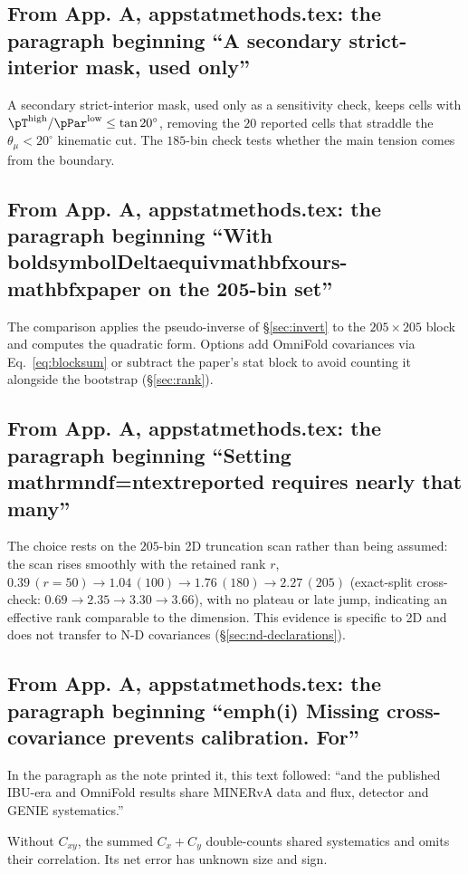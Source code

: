 \subsection{From App. A, appstatmethods.tex: the paragraph beginning ``A secondary strict-interior mask, used only''}
A secondary strict-interior mask, used only as a sensitivity check, keeps cells with $\pT^{\text{high}} / \pPar^{\text{low}} \le \tan 20^{\circ}$, removing the $20$ reported cells that straddle the $\theta_{\mu}<20^{\circ}$ kinematic cut. The $185$-bin check tests whether the main tension comes from the boundary.

\subsection{From App. A, appstatmethods.tex: the paragraph beginning ``With boldsymbolDeltaequivmathbfxours-mathbfxpaper on the 205-bin set''}
The comparison applies the pseudo-inverse of \S\ref{sec:invert} to the $205\times205$ block and computes the quadratic form. Options add OmniFold covariances via Eq.~\eqref{eq:blocksum} or subtract the paper's stat block to avoid counting it alongside the bootstrap (\S\ref{sec:rank}).

\subsection{From App. A, appstatmethods.tex: the paragraph beginning ``Setting mathrmndf=ntextreported requires nearly that many''}
The choice rests on the $205$-bin 2D truncation scan rather than being assumed: the scan rises smoothly with the retained rank $r$, $0.39\,(r{=}50)\to1.04\,(100)\to1.76\,(180)\to2.27\,(205)$ (exact-split cross-check: $0.69\to2.35\to3.30\to3.66$), with no plateau or late jump, indicating an effective rank comparable to the dimension. This evidence is specific to 2D and does not transfer to N-D covariances (\S\ref{sec:nd-declarations}).

\subsection{From App. A, appstatmethods.tex: the paragraph beginning ``emph(i) Missing cross-covariance prevents calibration. For''}
In the paragraph as the note printed it, this text followed: ``and the published IBU-era and OmniFold results share MINERvA data and flux, detector and GENIE systematics.''\par
Without $C_{xy}$, the summed $C_{x}+C_{y}$ double-counts shared systematics and omits their correlation. Its net error has unknown size and sign.


